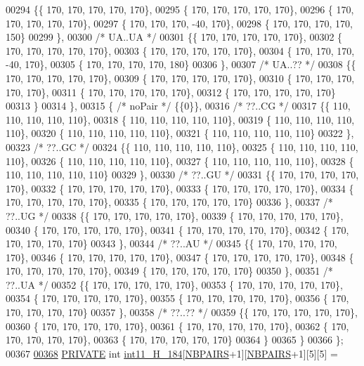 \begin{DoxyCode}
00294 \{\{ 170, 170, 170, 170, 170\},
00295 \{ 170, 170, 170, 170, 170\},
00296 \{ 170, 170, 170, 170, 170\},
00297 \{ 170, 170, 170, -40, 170\},
00298 \{ 170, 170, 170, 170, 150\}
00299 \},
00300 \textcolor{comment}{/* UA..UA */}
00301 \{\{ 170, 170, 170, 170, 170\},
00302 \{ 170, 170, 170, 170, 170\},
00303 \{ 170, 170, 170, 170, 170\},
00304 \{ 170, 170, 170, -40, 170\},
00305 \{ 170, 170, 170, 170, 180\}
00306 \},
00307 \textcolor{comment}{/* UA..?? */}
00308 \{\{ 170, 170, 170, 170, 170\},
00309 \{ 170, 170, 170, 170, 170\},
00310 \{ 170, 170, 170, 170, 170\},
00311 \{ 170, 170, 170, 170, 170\},
00312 \{ 170, 170, 170, 170, 170\}
00313 \}
00314 \},
00315 \{ \textcolor{comment}{/* noPair */} \{\{0\}\},
00316 \textcolor{comment}{/* ??..CG */}
00317 \{\{ 110, 110, 110, 110, 110\},
00318 \{ 110, 110, 110, 110, 110\},
00319 \{ 110, 110, 110, 110, 110\},
00320 \{ 110, 110, 110, 110, 110\},
00321 \{ 110, 110, 110, 110, 110\}
00322 \},
00323 \textcolor{comment}{/* ??..GC */}
00324 \{\{ 110, 110, 110, 110, 110\},
00325 \{ 110, 110, 110, 110, 110\},
00326 \{ 110, 110, 110, 110, 110\},
00327 \{ 110, 110, 110, 110, 110\},
00328 \{ 110, 110, 110, 110, 110\}
00329 \},
00330 \textcolor{comment}{/* ??..GU */}
00331 \{\{ 170, 170, 170, 170, 170\},
00332 \{ 170, 170, 170, 170, 170\},
00333 \{ 170, 170, 170, 170, 170\},
00334 \{ 170, 170, 170, 170, 170\},
00335 \{ 170, 170, 170, 170, 170\}
00336 \},
00337 \textcolor{comment}{/* ??..UG */}
00338 \{\{ 170, 170, 170, 170, 170\},
00339 \{ 170, 170, 170, 170, 170\},
00340 \{ 170, 170, 170, 170, 170\},
00341 \{ 170, 170, 170, 170, 170\},
00342 \{ 170, 170, 170, 170, 170\}
00343 \},
00344 \textcolor{comment}{/* ??..AU */}
00345 \{\{ 170, 170, 170, 170, 170\},
00346 \{ 170, 170, 170, 170, 170\},
00347 \{ 170, 170, 170, 170, 170\},
00348 \{ 170, 170, 170, 170, 170\},
00349 \{ 170, 170, 170, 170, 170\}
00350 \},
00351 \textcolor{comment}{/* ??..UA */}
00352 \{\{ 170, 170, 170, 170, 170\},
00353 \{ 170, 170, 170, 170, 170\},
00354 \{ 170, 170, 170, 170, 170\},
00355 \{ 170, 170, 170, 170, 170\},
00356 \{ 170, 170, 170, 170, 170\}
00357 \},
00358 \textcolor{comment}{/* ??..?? */}
00359 \{\{ 170, 170, 170, 170, 170\},
00360 \{ 170, 170, 170, 170, 170\},
00361 \{ 170, 170, 170, 170, 170\},
00362 \{ 170, 170, 170, 170, 170\},
00363 \{ 170, 170, 170, 170, 170\}
00364 \}
00365 \}
00366 \};
00367 
\mbox{\hyperlink{1_88_84__intloops_8h_a9309addb1f0a9539f439488b26073f93}{00368}} \mbox{\hyperlink{edit__cost_8h_a5e151c615eda34903514212f05a5ccf8}{PRIVATE}} \textcolor{keywordtype}{int} \mbox{\hyperlink{1_88_84__intloops_8h_a9309addb1f0a9539f439488b26073f93}{int11\_H\_184}}[\mbox{\hyperlink{1_88_84__epars_8h_a5e75221c779d618eab81e096f37e32ce}{NBPAIRS}}+1][\mbox{\hyperlink{1_88_84__epars_8h_a5e75221c779d618eab81e096f37e32ce}{NBPAIRS}}+1][5][5] =

\end{DoxyCode}
